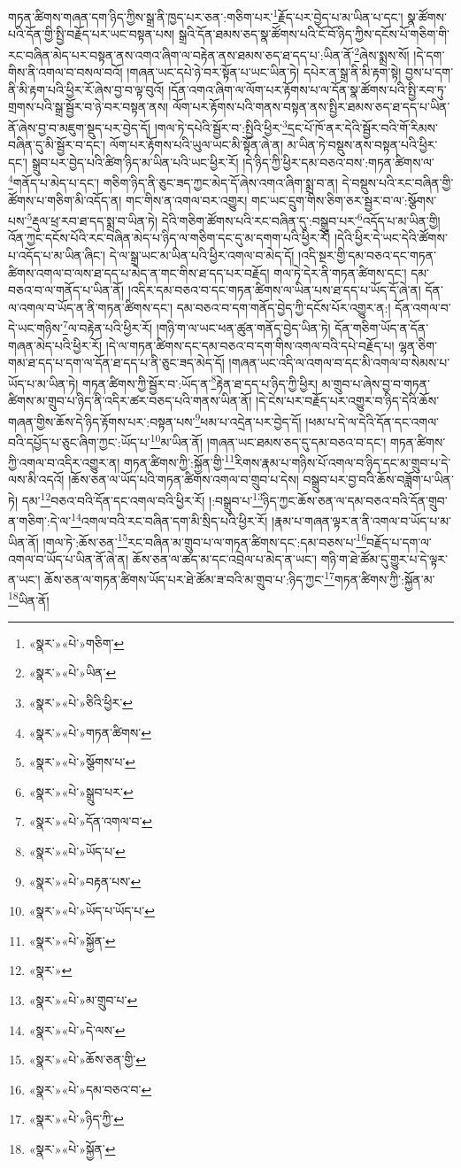 གཏན་ཚིགས་གཞན་དག་ཉིད་ཀྱིས་སྒྲ་ནི་ཁྱད་པར་ཅན་:གཅིག་པར་\footnote{«སྣར་»«པེ་»གཅིག་}རྗོད་པར་བྱེད་པ་མ་ཡིན་པ་དང་། སྣ་ཚོགས་པའི་དོན་གྱི་སྤྱི་བརྗོད་པར་ཡང་བསྟན་པས། སྒྲའི་དོན་ཐམས་ཅད་སྣ་ཚོགས་པའི་ངོ་བོ་ཉིད་ཀྱིས་དངོས་པོ་གཅིག་གི་རང་བཞིན་མེད་པར་བསྟན་ནས་འགའ་ཞིག་ལ་བརྟེན་ནས་ཐམས་ཅད་ཐ་དད་པ་:ཡིན་ནོ་\footnote{«སྣར་»«པེ་»ཡིན་}ཞེས་སྨྲས་སོ། །དེ་དག་གིས་ནི་འགལ་བ་བསལ་བའོ། །གཞན་ཡང་དཔེ་ཉེ་བར་སྟོན་པ་ཡང་ཡིན་ཏེ། དཔེར་ན་སྒྲ་ནི་མི་རྟག་སྟེ། བྱས་པ་དག་ནི་མི་རྟག་པའི་ཕྱིར་རོ་ཞེས་བྱ་བ་ལྟ་བུའོ། །དོན་འགའ་ཞིག་ལ་ལོག་པར་རྟོགས་པ་ལ་དོན་སྣ་ཚོགས་པའི་སྤྱི་རབ་ཏུ་གྲགས་པའི་སྒྲ་སྦྱོར་བ་ཉེ་བར་བསྟན་ནས། ལོག་པར་རྟོགས་པའི་གནས་བསྟན་ནས་སྤྱིར་ཐམས་ཅད་ཐ་དད་པ་ཡིན་ནོ་ཞེས་བྱ་བ་མཇུག་སྡུད་པར་བྱེད་དོ། །གལ་ཏེ་དཔེའི་སྦྱོར་བ་:སྤྱིའི་ཕྱིར་\footnote{«སྣར་»«པེ་»ཅིའི་ཕྱིར་}དྲང་པོ་ཁོ་ནར་དེའི་སྦྱོར་བའི་གོ་རིམས་བཞིན་དུ་མི་སྦྱོར་བ་དང་། ལོག་པར་རྟོགས་པའི་ཡུལ་ཡང་མི་སྟོན་ཞེ་ན། མ་ཡིན་ཏེ་བསྡུས་ནས་བསྟན་པའི་ཕྱིར་དང་། སྒྲུབ་པར་བྱེད་པའི་ཚིག་ཉིད་མ་ཡིན་པའི་ཡང་ཕྱིར་རོ། །དེ་ཉིད་ཀྱི་ཕྱིར་དམ་བཅའ་བས་:གཏན་ཚིགས་ལ་\footnote{«སྣར་»«པེ་»གཏན་ཚིགས་}གནོད་པ་མེད་པ་དང་། གཅིག་ཉིད་ནི་ཅུང་ཟད་ཀྱང་མེད་དོ་ཞེས་འགའ་ཞིག་སྨྲ་བ་ན། དེ་བསྡུས་པའི་རང་བཞིན་གྱི་ཚོགས་པ་གཅིག་མི་འདོད་ན། གང་གིས་ན་འགལ་བར་འགྱུར། གང་ཡང་དྲུག་གིས་ཅིག་ཅར་སྦྱར་བ་ལ་:སྩོགས་པས་\footnote{«སྣར་»«པེ་»སྩོགས་པ་}རྡུལ་ཕྲ་རབ་ཐ་དད་སྨྲ་བ་ཡིན་ཏེ། དེའི་གཅིག་ཚོགས་པའི་རང་བཞིན་དུ་:བསྒྲུབ་པར་\footnote{«སྣར་»«པེ་»སྒྲུབ་པར་}འདོད་པ་མ་ཡིན་གྱི། འོན་ཀྱང་དངོས་པོའི་རང་བཞིན་མེད་པ་ཉིད་ལ་གཅིག་དང་དུ་མ་དགག་པའི་ཕྱིར་རོ། །དེའི་ཕྱིར་དེ་ཡང་དེའི་ཚོགས་པ་འདོད་པ་མ་ཡིན་ཞིང་། དེ་ལ་སྒྲ་ཡང་མ་ཡིན་པའི་ཕྱིར་འགལ་བ་མེད་དོ། །འདི་སྔར་གྱི་དམ་བཅའ་དང་གཏན་ཚིགས་འགལ་བ་ལས་ཐ་དད་པ་མེད་ན་གང་གིས་ཐ་དད་པར་བརྗོད། གལ་ཏེ་དེར་ནི་གཏན་ཚིགས་དང་། དམ་བཅའ་བ་ལ་གནོད་པ་ཡིན་ནོ། །འདིར་དམ་བཅའ་བ་དང་གཏན་ཚིགས་ལ་ཡིན་པས་ཐ་དད་པ་ཡོད་དོ་ཞེ་ན། དོན་ལ་འགལ་བ་ཡོད་ན་ནི་གཏན་ཚིགས་དང་། དམ་བཅའ་བ་དག་གནོད་བྱེད་ཀྱི་དངོས་པོར་འགྱུར་ན:། དོན་འགལ་བ་དེ་ཡང་གཉིས་\footnote{«སྣར་»«པེ་»དོན་འགལ་བ་}ལ་བརྟེན་པའི་ཕྱིར་རོ། །གཉི་ག་ལ་ཡང་ཕན་ཚུན་གནོད་བྱེད་ཡིན་ཏེ། དོན་གཅིག་ཡོད་ན་དོན་གཞན་མེད་པའི་ཕྱིར་རོ། །དེ་ལ་གཏན་ཚིགས་དང་དམ་བཅའ་བ་དག་གིས་འགལ་བའི་དཔེ་བརྗོད་པ། ལྷན་ཅིག་གམ་ཐ་དད་པ་དག་ལ་དོན་ཐ་དད་པ་ནི་ཅུང་ཟད་མེད་དོ། །གཞན་ཡང་འདི་ལ་འགལ་བ་དང་མི་འགལ་བ་སེམས་པ་ཡོད་པ་མ་ཡིན་ཏེ། གཏན་ཚིགས་ཀྱི་སྦྱོར་བ་:ཡོད་ན་\footnote{«སྣར་»«པེ་»ཡོད་པ་}རྟེན་ཐ་དད་པ་ཉིད་ཀྱི་ཕྱིར། མ་གྲུབ་པ་ཞེས་བྱ་བ་གཏན་ཚིགས་མ་གྲུབ་པ་ཉིད་ནི་འདིར་ཚར་བཅད་པའི་གནས་ཡིན་ནོ། །དེ་ངེས་པར་བརྗོད་པར་འགྱུར་བ་ཉིད་དེའི་ཆོས་གཞན་གྱིས་ཆོས་དེ་ཉིད་རྟོགས་པར་:བསྟན་པས་\footnote{«སྣར་»«པེ་»བརྟན་པས་}ཕམ་པ་འདྲེན་པར་བྱེད་དོ། །ཕམ་པ་དེ་ལ་དེའི་དོན་དང་འགལ་བའི་དཔྱོད་པ་ཅུང་ཞིག་ཀྱང་:ཡོད་པ་\footnote{«སྣར་»«པེ་»ཡོད་པ་ཡོད་པ་}མ་ཡིན་ནོ། །གཞན་ཡང་ཐམས་ཅད་དུ་དམ་བཅའ་བ་དང་། གཏན་ཚིགས་ཀྱི་འགལ་བ་འདིར་འགྱུར་ན། གཏན་ཚིགས་ཀྱི་:སྐྱོན་གྱི་\footnote{«སྣར་»«པེ་»སྐྱོན་}རིགས་རྣམ་པ་གཉིས་པོ་འགལ་བ་ཉིད་དང་མ་གྲུབ་པ་དེ་ལས་མི་འདའོ། །ཆོས་ཅན་ལ་ཡོད་པའི་གཏན་ཚིགས་འགལ་བ་གྲུབ་པ་དེས། བསྒྲུབ་པར་བྱ་བའི་ཆོས་བཟློག་པ་ཡིན་ཏེ། དམ་\footnote{«སྣར་»}བཅའ་བའི་དོན་དང་འགལ་བའི་ཕྱིར་རོ། །:བསྒྲུབ་པ་\footnote{«སྣར་»«པེ་»མ་གྲུབ་པ་}ཉིད་ཀྱང་ཆོས་ཅན་ལ་དམ་བཅའ་བའི་དོན་གྲུབ་ན་གཅིག་:དེ་ལ་\footnote{«སྣར་»«པེ་»དེ་ལས་}འགལ་བའི་རང་བཞིན་དག་མི་སྲིད་པའི་ཕྱིར་རོ། །རྣམ་པ་གཞན་ལྟར་ན་ནི་འགལ་བ་ཡོད་པ་མ་ཡིན་ནོ། །གལ་ཏེ་:ཆོས་ཅན་\footnote{«སྣར་»«པེ་»ཆོས་ཅན་གྱི་}རང་བཞིན་མ་གྲུབ་པ་ལ་གཏན་ཚིགས་དང་:དམ་བཅས་པ་\footnote{«སྣར་»«པེ་»དམ་བཅའ་བ་}བརྗོད་པ་དག་ལ་འགལ་བ་ཡོད་པ་ཡིན་ནོ་ཞེ་ན། ཆོས་ཅན་ལ་ཚད་མ་དང་འབྲེལ་པ་མེད་ན་ཡང་། གཉི་ག་ཐེ་ཚོམ་དུ་གྱུར་པ་དེ་ལྟར་ན་ཡང་། ཆོས་ཅན་ལ་གཏན་ཚིགས་ཡོད་པར་ཐེ་ཚོམ་ཟ་བའི་མ་གྲུབ་པ་:ཉིད་ཀྱང་\footnote{«སྣར་»«པེ་»ཉིད་ཀྱི་}གཏན་ཚིགས་ཀྱི་:སྐྱོན་མ་\footnote{«སྣར་»«པེ་»སྐྱོན་}ཡིན་ནོ། 